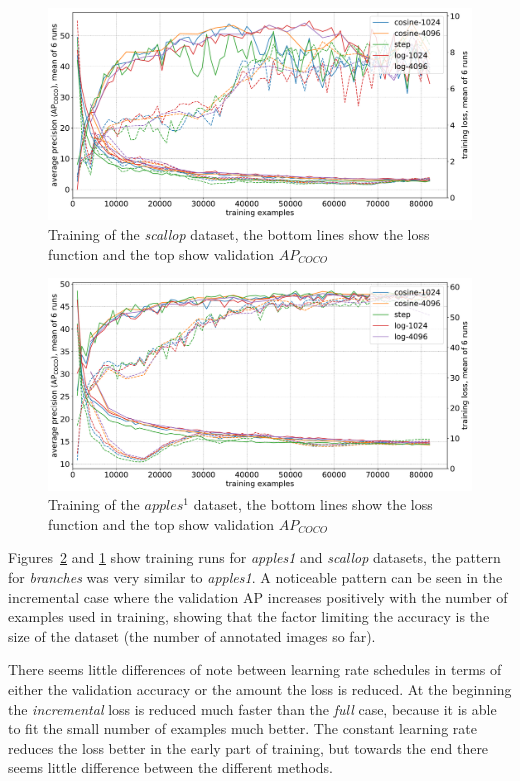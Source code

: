\begin{figure}[h]
  \centering
  \includegraphics[width=1.0\linewidth]{charts/training/lr_schedule/scallops.pdf}
  \caption{Training of the \emph{scallop} dataset, the bottom lines show the loss function and the top show validation $AP_{COCO}$}  
  \label{fig:scallop_lr}
\end{figure}

\begin{figure}[h]
  \centering
  \includegraphics[width=1.0\linewidth]{charts/training/lr_schedule/apples.pdf}
  \caption{Training of the $apples^1$ dataset, the bottom lines show the loss function and the top show validation $AP_{COCO}$}  
  \label{fig:apple_lr}
\end{figure}

Figures~\ref{fig:apple_lr} and \ref{fig:scallop_lr} show training runs for \emph{apples1} and \emph{scallop} datasets, the pattern for \emph{branches} was very similar to \emph{apples1}. A noticeable pattern can be seen in the incremental case where the validation \gls{AP} increases positively with the number of examples used in training, showing that the factor limiting the accuracy is the size of the dataset (the number of annotated images so far).

There seems little differences of note between learning rate schedules in terms of either the validation accuracy or the amount the loss is reduced. At the beginning the \emph{incremental} loss is reduced much faster than the \emph{full} case, because it is able to fit the small number of examples much better. The constant learning rate reduces the loss better in the early part of training, but towards the end there seems little difference between the different methods. 

